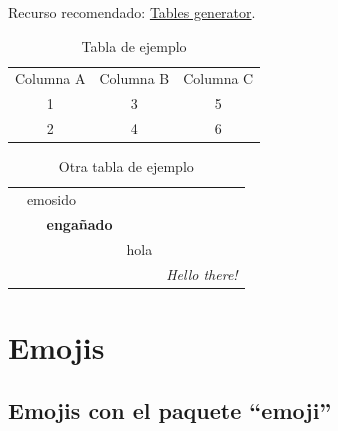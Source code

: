 Recurso recomendado: \href{https://www.tablesgenerator.com/}{Tables generator}.

\begin{table}[ht]
  \begin{tabular}{ |c|c|c| } 
    \hline
    Columna A & Columna B & Columna C\\ 
    1 & 3 & 5 \\ 
    2 & 4 & 6 \\ 
    \hline
  \end{tabular}
  \centering
  \caption{Tabla de ejemplo}
  \label{tab:tabla1}
\end{table}

\vspace{1cm}

\begin{table}[ht]
\begin{tabular}{ccccc}
\cline{1-4}
\multicolumn{2}{|c|}{emosido}                       & \multicolumn{1}{c|}{}      & \multicolumn{1}{c|}{}     &                       \\ \cline{1-4}
\multicolumn{1}{|c|}{} & \multicolumn{2}{c|}{\multirow{2}{*}{\textbf{engañado}}} & \multicolumn{1}{c|}{}     &                       \\ \cline{1-1} \cline{4-4}
\multicolumn{1}{|c|}{} & \multicolumn{2}{c|}{}                                   & \multicolumn{1}{c|}{}     &                       \\ \cline{1-4}
\multicolumn{1}{|c|}{} & \multicolumn{1}{c|}{}      & \multicolumn{1}{c|}{}      & \multicolumn{1}{c|}{hola} &                       \\ \cline{1-4}
                       &                            &                            &                           & \textit{Hello there!}
\end{tabular}
\centering
\caption{Otra tabla de ejemplo}
\label{tab:tablaEmosido}
\end{table}



\section{Emojis}


\subsection{Emojis con el paquete ``emoji''}

